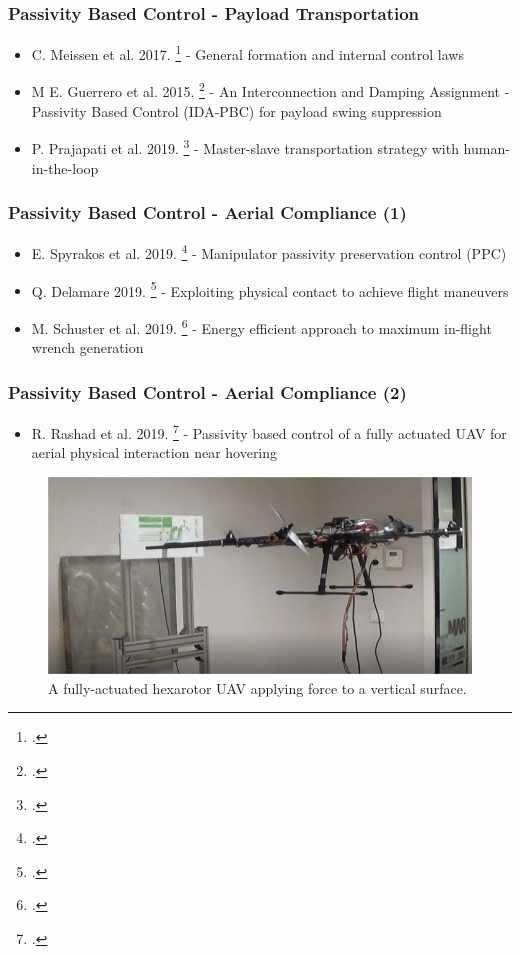 \begin{frame}
	\frametitle{Passivity Based Control - Payload Transportation}
	\begin{itemize}
		\item C. Meissen et al. 2017. \footcite{passivity-based-formation-load} - General formation and internal control laws
		\item M E. Guerrero et al. 2015. \footcite{passivity-based-payload-minimum-swing} - An Interconnection and Damping Assignment - Passivity Based Control (IDA-PBC) for payload swing suppression
		\item P. Prajapati et al. 2019. \footcite{payload-and-human} - Master-slave transportation strategy with human-in-the-loop
	\end{itemize}
\end{frame}

\begin{frame}
	\frametitle{Passivity Based Control - Aerial Compliance (1)}
	
	\begin{itemize}
		\item E. Spyrakos et al. 2019. \footcite{passive-variable-impedance-compliant} - Manipulator passivity preservation control (PPC)
		\item Q. Delamare 2019. \footcite{quadrotor-itneraction-environment} - Exploiting physical contact to achieve flight maneuvers
		\item M. Schuster et al. 2019. \footcite{max-wrench-min-energy} - Energy efficient approach to maximum in-flight wrench generation
	\end{itemize}
\end{frame}

\begin{frame}
	\frametitle{Passivity Based Control - Aerial Compliance (2)}
	\begin{itemize}
		\item R. Rashad et al. 2019. \footcite{passivity-based-physical-interaction} - Passivity based control of a fully actuated UAV for aerial physical interaction near hovering
	\end{itemize}
	\begin{figure}[H]
		\includegraphics[width=0.6\columnwidth]{figures/passivity-based-interaction.png}	
		\centering
		\caption{A fully-actuated hexarotor UAV applying force to a vertical surface.}
		\label{fig:aerial_compliance}
	\end{figure}
 \end{frame}

